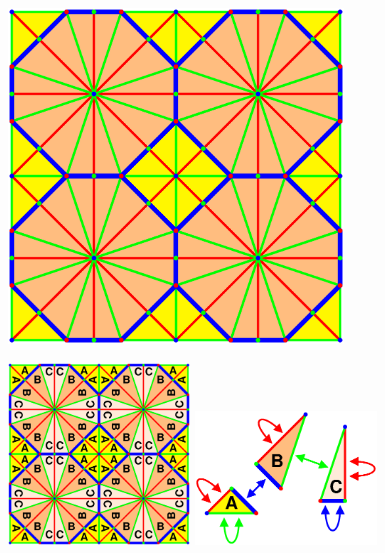 \documentclass{beamer}
\begin{document}
\begin{frame}
  \begin{center}
    \includegraphics[width=3.5in]{dsymbol2}
  \end{center}
\end{frame}

\begin{frame}
  \begin{center}
    \includegraphics[width=1.9in]{dsymbol3}
    \includegraphics[width=1.9in]{dsymbol4}
  \end{center}
\end{frame}
\end{document}
